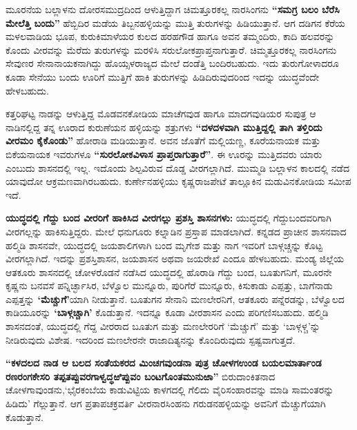 ಮೂರನೆಯ ಬಲ್ಲಾಳನು ದೋರಸಮುದ್ರದಿಂದ ಆಳುತ್ತಿದ್ದಾಗ ಚಿಮತ್ತೂರಕಲ್ಲ ನಾರಸಿಂಗನು \textbf{“ಸಮಗ್ರ ಬಲಂ ಬೆರೆಸಿ ಮೇಲೆತ್ತಿ ಬಂದು” }ಹೆಬ್ಬಿದಿರ ಮಡೆಯ ತಿಬ್ಬನಹಳ್ಳಿಯನ್ನು ಮುತ್ತಿ ತುರುಗಳನ್ನು ಹಿಡಿಯುತ್ತಾನೆ. ಆಗ ದಡಿಗನ ಕೆರೆಯ ಮಳಲವಾಡಿಯ ಭೂಪ, ಕುರುಕಿಮಾಳೆಯರ ಕುಲದ ಹರಹಗೌಡ ಹಾಗೂ ಅವನ ತಮ್ಮಂದಿರು, ಕಾದಿ ಹಲವರನ್ನು ಕೊಂದು ವೀರವನ್ನು ಮೆರೆದು ತುರುಗಳನ್ನು ಮರಳಿಸಿ ಸರುಲೋಕಪ್ರಾಪ್ತನಾಗುತ್ತಾರೆ. ಚಿಮ್ಮತ್ತೂರಕಲ್ಲ ನಾರಸಿಂಗನು ಸೇವುಣರ ಸೇನಾನಾಯಕನಾಗಿದ್ದು ಹೊಯ್ಸಳರಾಜ್ಯದ ಮೇಲೆ ದಂಡೆತ್ತಿ ಬಂದಿರಬಹುದು. ಇದು ತುರುಗೋಳಾದರೂ ಕೂಡಾ ಸೇನೆಯು ಬಂದು ಊರಿಗೆ ಮುತ್ತಿಗೆ ಹಾಕಿ ತುರುಗಳನ್ನು ಹಿಡಿದಿರುವುದರಿಂದ ಇದನ್ನು ಯುದ್ಧವೆಂದೇ ಹೇಳಬಹುದು.

ಕತ್ತರಿಘಟ್ಟ ನಾಡನ್ನು ಆಳುತ್ತಿದ್ದ ಮೊಡವನಕೋಡಿಯ ಮಾಚೆಗವುಡ ಹಾಗೂ ಮಾದಗವುಡಿಯರ ಸುಪುತ್ರ ಆ ನಾಡಿನಲ್ಲಿದ್ದ ತನ್ನ ಊರಾದ ಕುರುಣೆಯನ ಹಳ್ಳಿಯನ್ನು ಶತ್ರುಗಳು \textbf{“ದಳದಳವಾಗಿ ಮುತ್ತಿದ್ದಲ್ಲಿ ತಾಗಿ ತಳ್ತಿರಿದು ವೀರಮಂ ಕೈಕೊಂಡು”} ಹೋರಾಡಿ ಮಡಿಯುತ್ತಾನೆ. ಅವನ ಜೊತೆಗೆ ಮಲ್ಲಿಯಣ್ಣ, ಕೂರೆಯನಾಯಕ ಮತ್ತು ಬಿಕೆಯನಾಯಕ ಇವರುಗಳೂ \textbf{“ಸುರಲೋಕವಿಳಾಸ ಪ್ರಾಪ್ತರಾಗುತ್ತಾರೆ”}. ಈ ಊರನ್ನು ಮುತ್ತಿದವರು ಯಾರು ಎಂಬುದು ಶಾಸನದಲ್ಲಿ ಇಲ್ಲ. ಇದೊಂದು ಶಿಲ್ಪವಿರುವ ದೊಡ್ಡ ವೀರಗಲ್ಲಾಗಿದೆ. ಮುಮ್ಮಡಿ ಬಲ್ಲಾಳನ ಕಾಲದಲ್ಲಿ ನಡೆದ ಯಾವುದೋ ಆಕ್ರಮಣವಾಗಿರಬಹುದು. ಕುರ್ಣೇನಹಳ್ಳಿಯು ಕೃಷ್ಣರಾಜಪೇಟೆ ತಾಲ್ಲೂಕಿನ ಮಡುವಿನಕೋಡಿಯ ಸಮೀಪ ಇದೆ.

\textbf{ಯುದ್ಧದಲ್ಲಿ ಗೆದ್ದು ಬಂದ ವೀರರಿಗೆ ಹಾಕಿಸಿದ ವೀರಗಲ್ಲು ಪ್ರಶಸ್ತಿ ಶಾಸನಗಳು:} ಯುದ್ಧದಲ್ಲಿ ಗೆದ್ದುಬಂದವರಿಗಾಗಿ ವೀರಗಲ್ಲನ್ನು ಹಾಕಿಸುತ್ತಿದ್ದರು. ಮೇಲೆ ಧನುಗೂರು ಕಲ್ನಾಡಿನ ಪ್ರಸ್ತಾಪ ಮಾಡಲಾಗಿದೆ. ಕನ್ನಡದ ಪ್ರಾಚೀನ ಶಾಸನವಾದ ಹಲ್ಮಿಡಿ ಶಾಸನವೇ, ಯುದ್ಧದಲ್ಲಿ ಜಯಶಾಲಿಗಳಾಗಿ ಬಂದ ಮೃಗೇಶ ಮತ್ತು ನಾಗ ಇವರಿಗೆ ಬಾಳ್ಗಚ್ಚನ್ನು ಕೊಟ್ಟ ವೀರಗಲ್ಲಾಗಿದೆ. ಇದನ್ನು ಪ್ರಶಸ್ತಿಶಾಸನ, ಜಯಶಾಸನ ಅಥವಾ ಜಯರೇಖೆ ಎಂದೂ ಹೇಳಬಹುದು. ಮಂಡ್ಯ ಜಿಲ್ಲೆಯ ಆತಕೂರು ಶಾಸನದಲ್ಲಿ ಚೋಳರೊಡನೆ ನಡೆಸಿದ ಯುದ್ಧದಲ್ಲಿ ಹೊರಾಡಿ ಗೆದ್ದು ಬಂದ, ಬೂತುಗನಿಗೆ, ಮೂರನೇ ಕೃಷ್ಣನು ಬನವಸೆ ಪನ್ನಿರ್ಚ್ಛಾಸಿರ, ಬೆಳ್ವೊಲ ಮುನ್ನೂರು, ಪುರಿಗೆರೆ ಮುನ್ನೂರು, ಕಿಸುಕಾಡು ಎಪ್ಪತ್ತು, ಬಾಗೆನಾಡು ಎಪ್ಪತ್ತನ್ನು \textbf{‘ಮೆಚ್ಚುಗೆ’}ಯಾಗಿ ನೀಡುತ್ತಾನೆ. ಬೂತುಗನ ಸೇನಾನಿ ಮಣಲೇರನಿಗೆ, ಆತಕೂರು ಪನ್ನೆರಡನ್ನು, ಬೆಳ್ವೊಲದ ಕಾಡಿಯೂರನ್ನು \textbf{‘ಬಾಳ್ಗಚ್ಚಾಗಿ’} ಕೊಡುತ್ತಾನೆ. ಇದನ್ನೂ ಕೂಡಾ ವೀರಶಾಸನ ಎಂದು ಪರಿಗಣಿಸಬಹುದು. ಹಲ್ಮಿಡಿ ಶಾಸನದಂತೆ, ಯುದ್ಧದಲ್ಲಿ ಗೆದ್ದ ವೀರರಾದ ಬೂತುಗ ಮತ್ತು ಮಣಲೇರರಿಗೆ ‘ಮೆಚ್ಚುಗೆ’ ಮತ್ತು ‘ಬಾಳ್ಗಳ್ಚ’ನ್ನು ನೀಡಿರುವುದು ವಿಶೇಷ. ಇದರಿಂದ ಮಣಲೇರನೇ ರಾಜಾದಿತ್ಯನನ್ನು ಕೊಂದಿರು\-ವುದು ಸ್ಪಷ್ಟವಾಗುತ್ತದೆ.

\newpage

\textbf{“ಕಳದಲದ ನಾಡ ಆ ಬಲದ ಸಂತೆಯಕರದ ಮಿಂಚಗವುಂಡನಾ ಪುತ್ರ ಚೋಳಗಉಂಡ ಬಯಲಮಾರ್ತಾಂಡ ರಣರಂಗಕೇಸರಿ ತಪ್ಪತಪ್ಪುವರಗಾಳ್ವದ್ಧಱಿಪ್ಪುವಂ ಬಂಟಗೊಂತಮುನುಱಾ”} ಬಿರುದಾಂಕಿತನಾದ ಚೋಳಗಾವುಂಡನು,\break ‘ಭೈರಕಂಬೆಯ ಕಾಡುವಿಟ್ಟಿಯ ಕಾಳಗದಲ್ಲಿ ಗೆಲಿದು ವೈರಿಸಂಹಾರವನ್ನು ಮಾಡಿ ಸಾಮಂತರನ್ನು ಹಿಡಿದು’ ಗೆಲ್ಲುತ್ತಾನೆ. ಆಗ ಪ್ರತಾಪಚಕ್ರವರ್ತಿ ವೀರನಾರಸಿಂಹನು ಗರುಡನಹಳ್ಳಿಯನ್ನು ಅವನಿಗೆ ಮೆಚ್ಚುಗೆಯಾಗಿ ಕೊಡುತ್ತಾನೆ.

